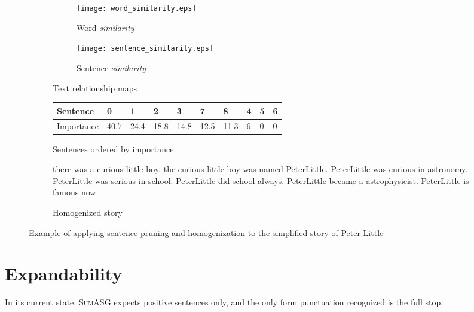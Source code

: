 \begin{figure}[H]
\begin{subfigure}{\textwidth}
\begin{subfigure}{0.5\textwidth}
\renewcommand\thesubfigure{\roman{subfigure}}
\texttt{[image: word\_similarity.eps]}
\caption{Word \textit{similarity}}
\end{subfigure}
\begin{subfigure}{0.5\textwidth}
\renewcommand\thesubfigure{\roman{subfigure}}
\texttt{[image: sentence\_similarity.eps]}
\caption{Sentence \textit{similarity}}
\end{subfigure}
\setcounter{subfigure}{0}
\caption{Text relationship maps}
\end{subfigure}
\begin{subfigure}{\textwidth}
\vspace{\baselineskip}
\centering
\begin{tabular}{@{}llllllllll@{}}
\toprule
Sentence   & 0    & 1    & 2    & 3    & 7    & 8    & 4 & 5 & 6 \\ \midrule
Importance & 40.7 & 24.4 & 18.8 & 14.8 & 12.5 & 11.3 & 6 & 0 & 0 \\ \bottomrule
\end{tabular}
\caption{Sentences ordered by importance}
\end{subfigure}
\begin{subfigure}{\textwidth}
\vspace{\baselineskip}
\begin{displayquote}
there was a curious little boy. the curious little boy was named PeterLittle. PeterLittle was curious in astronomy. PeterLittle was serious in school. PeterLittle did school always. PeterLittle became a astrophysicist. PeterLittle is famous now.
\end{displayquote}
\caption{Homogenized story}
\end{subfigure}
\caption{Example of applying sentence pruning and homogenization to the simplified story of Peter Little}
\label{fig:preprocessor_example}
\end{figure}

\section{Expandability}

In its current state, \textsc{SumASG} expects positive sentences only, and the only form punctuation recognized is the full stop.

